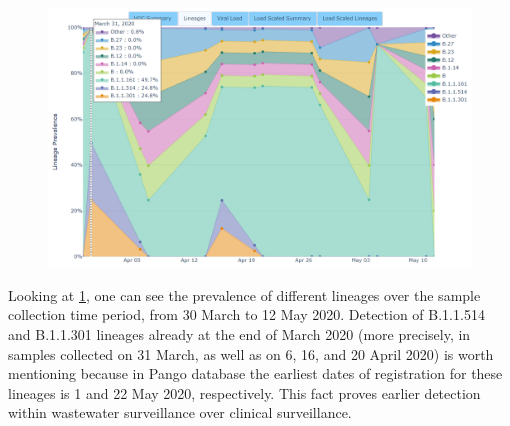     \begin{figure}[ht!]
        \centering
        \includegraphics[width=1\textwidth]{figures/results/real/uk-freyja-dash-early-detection.png}
        \label{fig:results:real:uk-freyja-dash}
    \end{figure}
    
    Looking at \cref{fig:results:real:uk-freyja-dash}, one can see the prevalence of different lineages over the sample collection time period, from 30 March to 12 May 2020. Detection of B.1.1.514 and B.1.1.301 lineages already at the end of March 2020 (more precisely, in samples collected on 31 March, as well as on 6, 16, and 20 April 2020) is worth mentioning because in Pango database \cite{covlineages} the earliest dates of registration for these lineages is 1 and 22 May 2020, respectively. This fact proves earlier detection within wastewater surveillance over clinical surveillance.
\clearpage
